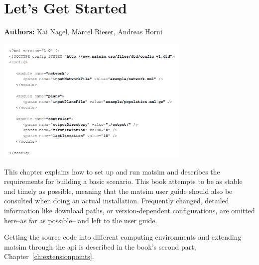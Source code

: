 \chapter{Let's Get Started}
\label{ch:lgstarted}
\hfill \textbf{Authors:} Kai Nagel, Marcel Rieser, Andreas Horni

\begin{center} \includegraphics[width=0.7\textwidth, angle=0]{using/figures/config.png} \end{center}


This chapter explains how to set up and run \gls{matsim} and describes the requirements for building a basic \gls{scenario}. This book attempts to be as stable and timely as possible, meaning that the \gls{matsim} user guide \citep[][]{MATSim_Userguide_2015} should also be consulted when doing an actual installation. Frequently changed, detailed information like download paths, or version-dependent configurations, are omitted here--as far as possible-- and left to the user guide. 

Getting the source code into different computing environments and extending \gls{matsim} through the \gls{api} is described in the book's second part, Chapter~\ref{ch:extensionpoints}.



